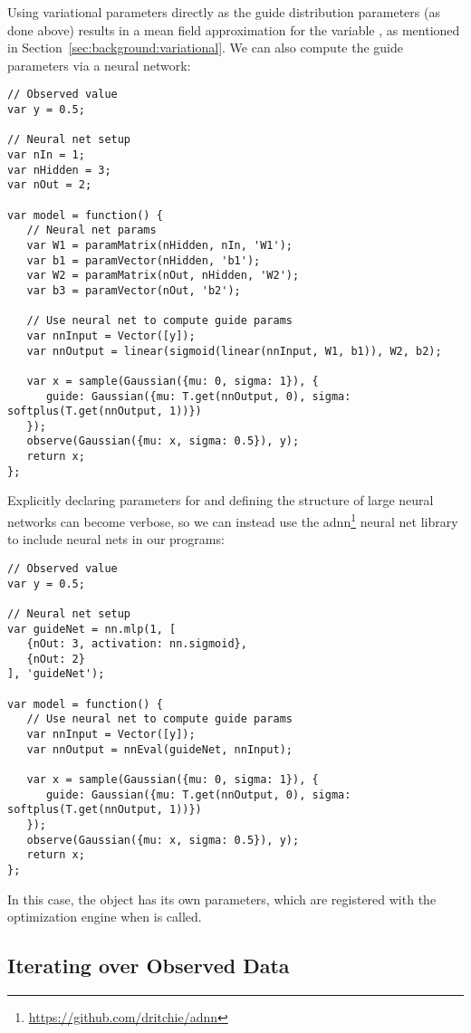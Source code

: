 Using variational parameters directly as the guide distribution parameters (as done above) results in a mean field approximation for the variable , as mentioned in Section~\ref{sec:background:variational}.
We can also compute the guide parameters via a neural network:~
\begin{lstlisting}
// Observed value
var y = 0.5;

// Neural net setup
var nIn = 1;
var nHidden = 3;
var nOut = 2;

var model = function() {
   // Neural net params
   var W1 = paramMatrix(nHidden, nIn, 'W1');
   var b1 = paramVector(nHidden, 'b1');
   var W2 = paramMatrix(nOut, nHidden, 'W2');
   var b3 = paramVector(nOut, 'b2');

   // Use neural net to compute guide params
   var nnInput = Vector([y]);
   var nnOutput = linear(sigmoid(linear(nnInput, W1, b1)), W2, b2);

   var x = sample(Gaussian({mu: 0, sigma: 1}), {
      guide: Gaussian({mu: T.get(nnOutput, 0), sigma: softplus(T.get(nnOutput, 1))})
   });
   observe(Gaussian({mu: x, sigma: 0.5}), y);
   return x;
};
\end{lstlisting}
Explicitly declaring parameters for and defining the structure of large neural networks can become verbose, so we can instead use the adnn\footnote{\url{https://github.com/dritchie/adnn}} neural net library to include neural nets in our programs:
\begin{lstlisting}
// Observed value
var y = 0.5;

// Neural net setup
var guideNet = nn.mlp(1, [
   {nOut: 3, activation: nn.sigmoid},
   {nOut: 2}
], 'guideNet');

var model = function() {
   // Use neural net to compute guide params
   var nnInput = Vector([y]);
   var nnOutput = nnEval(guideNet, nnInput);

   var x = sample(Gaussian({mu: 0, sigma: 1}), {
      guide: Gaussian({mu: T.get(nnOutput, 0), sigma: softplus(T.get(nnOutput, 1))})
   });
   observe(Gaussian({mu: x, sigma: 0.5}), y);
   return x;
};
\end{lstlisting}
In this case, the  object has its own parameters, which are registered with the optimization engine when  is called.

\subsection{Iterating over Observed Data}

